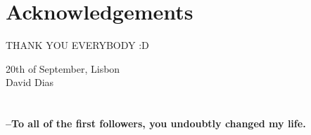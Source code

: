 \chapter*{Acknowledgements}
\thispagestyle{empty}

THANK YOU EVERYBODY :D

\vspace{15pt}
\vfill
\begin{flushright}
    \begin{minipage}{8cm}
        \begin{center}
            20th of September, Lisbon \\ 
            David Dias
        \end{center}
    \end{minipage}
\end{flushright}

\cleardoublepage

\chapter*{}
\thispagestyle{empty}
\vfill
\vfill
\begin{flushright}
    \begin{minipage}{8cm}
        \begin{center}
            {\Large\bf --To all of the first followers, you undoubtly changed my life.}

        \end{center}
    \end{minipage}
\end{flushright}

\cleardoublepage
